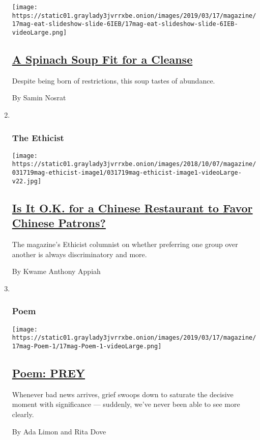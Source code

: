 \begin{enumerate}
  \texttt{[image: https://static01.graylady3jvrrxbe.onion/images/2019/03/17/magazine/17mag-eat-slideshow-slide-6IEB/17mag-eat-slideshow-slide-6IEB-videoLarge.png]}

  \hypertarget{a-spinach-soup-fit-for-a-cleanse}{%
  \subsection{\texorpdfstring{\href{/2019/03/13/magazine/spinach-soup-cleanse-recipe.html}{A
  Spinach Soup Fit for a
  Cleanse}}{A Spinach Soup Fit for a Cleanse}}\label{a-spinach-soup-fit-for-a-cleanse}}

  Despite being born of restrictions, this soup tastes of abundance.

  By Samin Nosrat
\item ~
  \hypertarget{the-ethicist}{%
  \subsubsection{The Ethicist}\label{the-ethicist}}

  \texttt{[image: https://static01.graylady3jvrrxbe.onion/images/2018/10/07/magazine/031719mag-ethicist-image1/031719mag-ethicist-image1-videoLarge-v22.jpg]}

  \hypertarget{is-it-ok-for-a-chinese-restaurant-to-favor-chinese-patrons}{%
  \subsection{\texorpdfstring{\href{/2019/03/12/magazine/is-it-ok-for-a-chinese-restaurant-to-favor-chinese-patrons.html}{Is
  It O.K. for a Chinese Restaurant to Favor Chinese
  Patrons?}}{Is It O.K. for a Chinese Restaurant to Favor Chinese Patrons?}}\label{is-it-ok-for-a-chinese-restaurant-to-favor-chinese-patrons}}

  The magazine's Ethicist columnist on whether preferring one group over
  another is always discriminatory and more.

  By Kwame Anthony Appiah
\item ~
  \hypertarget{poem}{%
  \subsubsection{Poem}\label{poem}}

  \texttt{[image: https://static01.graylady3jvrrxbe.onion/images/2019/03/17/magazine/17mag-Poem-1/17mag-Poem-1-videoLarge.png]}

  \hypertarget{poem-prey}{%
  \subsection{\texorpdfstring{\href{/2019/03/14/magazine/poem-prey.html}{Poem:
  PREY}}{Poem: PREY}}\label{poem-prey}}

  Whenever bad news arrives, grief swoops down to saturate the decisive
  moment with significance --- suddenly, we've never been able to see
  more clearly.

  By Ada Limon and Rita Dove
\end{enumerate}

